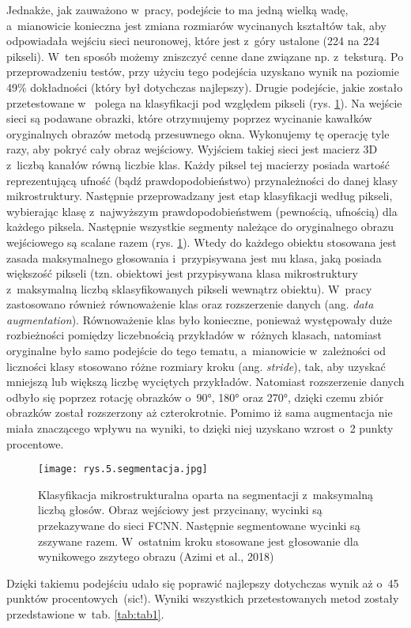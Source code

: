 \noindent Jednakże, jak zauważono w~pracy, podejście to ma jedną wielką wadę, a~mianowicie konieczna jest zmiana rozmiarów wycinanych kształtów tak, aby odpowiadała wejściu sieci neuronowej, które jest z~góry ustalone (224 na 224 pikseli). W~ten sposób możemy zniszczyć cenne dane związane np. z~teksturą. Po przeprowadzeniu testów, przy użyciu tego podejścia uzyskano wynik na poziomie 49\% dokładności (który był dotychczas najlepszy). Drugie podejście, jakie zostało przetestowane w~\cite{Azimi18} polega na klasyfikacji pod względem pikseli (rys. \ref{fig:mesh5}). Na wejście sieci są podawane obrazki, które otrzymujemy poprzez wycinanie kawałków oryginalnych obrazów metodą przesuwnego okna. Wykonujemy tę operację tyle razy, aby pokryć cały obraz wejściowy. Wyjściem takiej sieci jest macierz 3D z~liczbą kanałów równą liczbie klas. Każdy piksel tej macierzy posiada wartość reprezentującą ufność (bądź prawdopodobieństwo) przynależności do danej klasy mikrostruktury. Następnie przeprowadzany jest etap klasyfikacji według pikseli, wybierając klasę z~najwyższym prawdopodobieństwem (pewnością, ufnością) dla każdego piksela. Następnie wszystkie segmenty należące do oryginalnego obrazu wejściowego są scalane razem (rys. \ref{fig:mesh5}). Wtedy do każdego obiektu stosowana jest zasada maksymalnego głosowania i~przypisywana jest mu klasa, jaką posiada większość pikseli (tzn. obiektowi jest przypisywana klasa mikrostruktury z~maksymalną liczbą sklasyfikowanych pikseli wewnątrz obiektu). W~pracy zastosowano również równoważenie klas oraz rozszerzenie danych (ang. \textit{data augmentation}). Równoważenie klas było konieczne, ponieważ występowały duże rozbieżności pomiędzy liczebnością przykładów w~różnych klasach, natomiast oryginalne było samo podejście do tego tematu, a~mianowicie w~zależności od liczności klasy stosowano różne rozmiary kroku (ang. \textit{stride}), tak, aby uzyskać mniejszą lub większą liczbę wyciętych przykładów. Natomiast rozszerzenie danych odbyło się poprzez rotację obrazków o~90°, 180° oraz 270°, dzięki czemu zbiór obrazków został rozszerzony aż czterokrotnie. Pomimo iż sama augmentacja nie miała znaczącego wpływu na wyniki, to dzięki niej uzyskano wzrost o~2 punkty procentowe.
\begin{figure}[h]
    \centering
    \texttt{[image: rys.5.segmentacja.jpg]}
    \caption{Klasyfikacja mikrostrukturalna oparta na segmentacji z~maksymalną liczbą głosów. Obraz wejściowy jest przycinany, wycinki są przekazywane do sieci FCNN. Następnie segmentowane wycinki są zszywane razem. W~ostatnim kroku stosowane jest głosowanie dla wynikowego zszytego obrazu (Azimi et al., 2018)}
    \label{fig:mesh5}
\end{figure}
Dzięki takiemu podejściu udało się poprawić najlepszy dotychczas wynik aż o~45 punktów procentowych~(sic!). Wyniki wszystkich przetestowanych metod zostały przedstawione w~tab. \ref{tab:tab1}.

